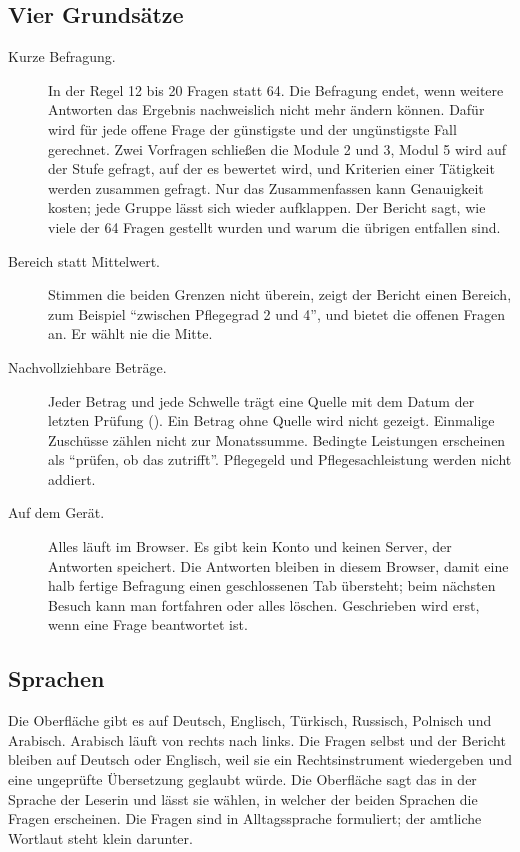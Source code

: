 \documentclass[10pt,parskip=half-]{scrartcl}
\begin{document}
\subsection{Vier Grundsätze}
\begin{description}
  \item[Kurze Befragung.] In der Regel 12 bis 20 Fragen statt 64. Die Befragung endet, wenn
    weitere Antworten das Ergebnis nachweislich nicht mehr ändern können. Dafür wird für jede
    offene Frage der günstigste und der ungünstigste Fall gerechnet. Zwei Vorfragen schließen
    die Module 2 und 3, Modul 5 wird auf der Stufe gefragt, auf der es bewertet wird, und
    Kriterien einer Tätigkeit werden zusammen gefragt. Nur das Zusammenfassen kann Genauigkeit
    kosten; jede Gruppe lässt sich wieder aufklappen. Der Bericht sagt, wie viele der 64 Fragen
    gestellt wurden und warum die übrigen entfallen sind.
  \item[Bereich statt Mittelwert.] Stimmen die beiden Grenzen nicht überein, zeigt der Bericht
    einen Bereich, zum Beispiel \enquote{zwischen Pflegegrad 2 und 4}, und bietet die offenen
    Fragen an. Er wählt nie die Mitte.
  \item[Nachvollziehbare Beträge.] Jeder Betrag und jede Schwelle trägt eine Quelle mit dem
    Datum der letzten Prüfung (). Ein Betrag ohne Quelle wird
    nicht gezeigt. Einmalige Zuschüsse zählen nicht zur Monatssumme. Bedingte Leistungen
    erscheinen als \enquote{prüfen, ob das zutrifft}. Pflegegeld und Pflegesachleistung werden
    nicht addiert.
  \item[Auf dem Gerät.] Alles läuft im Browser. Es gibt kein Konto und keinen Server, der
    Antworten speichert. Die Antworten bleiben in diesem Browser, damit eine halb fertige
    Befragung einen geschlossenen Tab übersteht; beim nächsten Besuch kann man fortfahren oder
    alles löschen. Geschrieben wird erst, wenn eine Frage beantwortet ist.
\end{description}

\subsection{Sprachen}
Die Oberfläche gibt es auf Deutsch, Englisch, Türkisch, Russisch, Polnisch und Arabisch.
Arabisch läuft von rechts nach links. Die Fragen selbst und der Bericht bleiben auf Deutsch oder
Englisch, weil sie ein Rechtsinstrument wiedergeben und eine ungeprüfte Übersetzung geglaubt
würde. Die Oberfläche sagt das in der Sprache der Leserin und lässt sie wählen, in welcher der
beiden Sprachen die Fragen erscheinen. Die Fragen sind in Alltagssprache formuliert; der amtliche
Wortlaut steht klein darunter.
\end{document}
